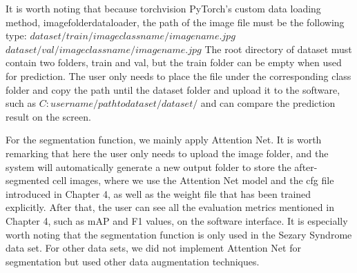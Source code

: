 It is worth noting that because torchvision PyTorch's custom data loading method, imagefolderdataloader, the path of the image file must be the following type:\newline
$dataset/train/imageclassname/imagename.jpg$ \newline
$dataset/val/imageclassname/imagename.jpg$\newline
The root directory of dataset must contain two folders, train and val, but the train folder can be empty when used for prediction. The user only needs to place the file under the corresponding class folder and copy the path until the dataset folder and upload it to the software, such as $C:username/pathtodataset/dataset/ $ and can compare the prediction result on the screen.


For the segmentation function, we mainly apply Attention Net. It is worth remarking that here the user only needs to upload the image folder, and the system will automatically generate a new output folder to store the after-segmented cell images, where we use the Attention Net model and the cfg file introduced in Chapter 4, as well as the weight file that has been trained explicitly. After that, the user can see all the evaluation metrics mentioned in Chapter 4, such as mAP and F1 values, on the software interface. 
It is especially worth noting that the segmentation function is only used in the Sezary Syndrome data set. For other data sets, we did not implement Attention Net for segmentation but used other data augmentation techniques.




